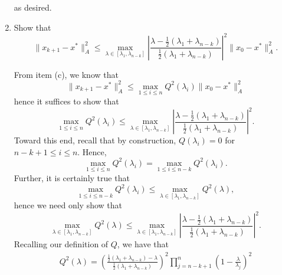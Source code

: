 \documentclass{../../../kin_math}
\begin{document}
\begin{questions}
\begin{enumerate}
\begin{solution}
\begin{equation*}
      \end{equation*}
      as desired.
    \end{solution}
    \item Show that
    \begin{equation}
      \lVert x_{k + 1} - x^* \rVert_A^2 \leq \max_{\lambda \in [\lambda_1, \lambda_{n - k}]} \left| \frac{\lambda - \frac{1}{2}(\lambda_1 + \lambda_{n - k})}{\frac{1}{2}(\lambda_1 + \lambda_{n - k})} \right|^2 \lVert x_0 - x^* \rVert_A^2.
    \end{equation}
    \begin{solution}
      From item (c), we know that
      \begin{equation*}
        \lVert x_{k + 1} - x^* \rVert_A^2 \leq \max_{1 \leq i \leq n} Q^2(\lambda_i) \lVert x_0 - x^* \rVert_A^2
      \end{equation*}
      hence it suffices to show that
      \begin{equation*}
        \max_{1 \leq i \leq n} Q^2(\lambda_i) \leq \max_{\lambda \in [\lambda_1, \lambda_{n - k}]} \left| \frac{\lambda - \frac{1}{2}(\lambda_1 + \lambda_{n - k})}{\frac{1}{2}(\lambda_1 + \lambda_{n - k})} \right|^2.
      \end{equation*}
      Toward this end, recall that by construction, $Q(\lambda_i) = 0$ for $n - k + 1 \leq i \leq n$. Hence,
      \begin{equation*}
        \max_{1 \leq i \leq n} Q^2(\lambda_i) = \max_{1 \leq i \leq n - k} Q^2(\lambda_i).
      \end{equation*}
      Further, it is certainly true that
      \begin{equation*}
        \max_{1 \leq i \leq n - k} Q^2(\lambda_i) \leq \max_{\lambda \in [\lambda_1, \lambda_{n - k}]} Q^2(\lambda),
      \end{equation*}
      hence we need only show that
      \begin{equation*}
        \max_{\lambda \in [\lambda_1, \lambda_{n - k}]} Q^2(\lambda) \leq \max_{\lambda \in [\lambda_1, \lambda_{n - k}]} \left| \frac{\lambda - \frac{1}{2}(\lambda_1 + \lambda_{n - k})}{\frac{1}{2}(\lambda_1 + \lambda_{n - k})} \right|^2.
      \end{equation*}
      Recalling our definition of $Q$, we have that
      \begin{multline*}
        Q^2(\lambda) = \left(\frac{\frac{1}{2}(\lambda_1 + \lambda_{n - k}) - \lambda}{\frac{1}{2}(\lambda_1 + \lambda_{n - k})}\right)^2 \prod_{j = n - k + 1}^n \left(1 - \frac{\lambda}{\lambda_j}\right)^2 \\

\end{multline*}
\end{solution}
\end{enumerate}
\end{questions}
\end{document}
